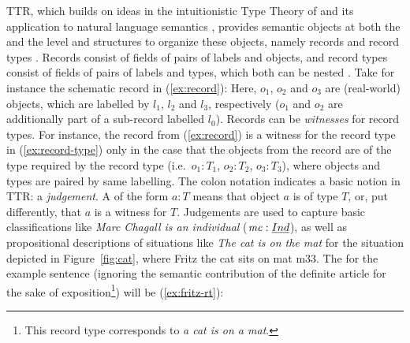 \documentclass[output=paper,biblatex,babelshorthands,newtxmath,draftmode,colorlinks,citecolor=brown]{langscibook}
\begin{document}
TTR, which builds on ideas in the intuitionistic Type Theory of \citet{Martin-Loef:1984} and its
application to natural language semantics \citep[see][]{Ranta:2015}, provides semantic objects at
both the  and the  level and structures to organize these objects, namely
records and record types %
\citetext{see \citealp{Cooper:2005:a}, \citealp{Cooper:2005:b}, \citealp{Cooper:2012}, \citealp{Cooper:2017:a}, and \citealp{Cooper:Ginzburg:2015} for expositions}. 
%
Records consist of fields of pairs of labels and objects, and record types consist of fields of pairs of labels and types, which both can be nested \citep{Cooper:ms}.
%
%
Take for instance the schematic record in (\ref{ex:record}):
%
\ea \label{ex:record}
\avm{
[$l_0$ & = [$l_1$ & = $o_1$ \\
			$l_2$ & = $o_2$] \\
$l_3$ & = $o_3$]
}
\z
%
Here, $o_1$, $o_2$ and $o_3$ are (real-world) objects, which are labelled by $l_1$, $l_2$ and $l_3$, respectively ($o_1$ and $o_2$ are additionally part of a sub-record labelled $l_0$).
%
Records can be \emph{witnesses} for record types.
%
For instance, the record from (\ref{ex:record}) is a witness for the record type in (\ref{ex:record-type}) only in the case that the objects from the record are of the type required by the record type (i.e.\ $o_1 : T_1$, $o_2 : T_2$, $o_3 : T_3$), where objects and types are paired by same labelling.
%
\ea \label{ex:record-type}
\avm{
[$l_0$ & :	[$l_1$ & : $T_1$ \\
			$l_2$ & : $T_2$] \\
$l_3$ & : $T_3$ ]
}
\z
%
The colon notation indicates a basic notion in TTR: a \emph{judgement}. 
%
A  of the form $a : T$ means that object $a$ is of type $T$, or, put differently, that $a$ is a witness for $T$.
%
Judgements are used to capture basic classifications like \textit{Marc Chagall is an individual} ($\mathit{mc} : \emph{Ind}$), as well as propositional descriptions of situations like \textit{The cat is on the mat} for the situation depicted in Figure~\ref{fig:cat}, where Fritz the cat sits on mat m33. 
%
The  for the example sentence (ignoring the semantic contribution of the definite article for the sake of exposition\footnote{This record type corresponds to \textit{a cat is on a mat}.}) will be (\ref{ex:fritz-rt}):
\end{document}
